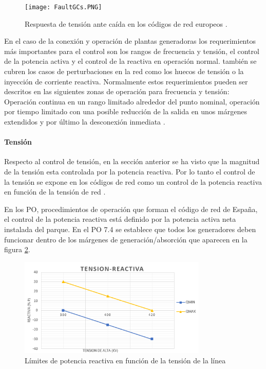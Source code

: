 \documentclass{book}
\begin{document}
\begin{figure}[h!]
\centering
\texttt{[image: FaultGCs.PNG]}
\caption{Respuesta de tensi\'on ante ca\'ida en los c\'odigos de red europeos \cite{FaultGC}.}
\label{FaultGCs}
\end{figure}

En el caso de la conexi\'on y operaci\'on de plantas generadoras los requerimientos m\'as importantes para el control son los rangos de frecuencia y tensi\'on, el control de la potencia activa y el control de la reactiva en operaci\'on normal. tambi\'en se cubren los casos de perturbaciones en la red como los huecos de tensi\'on o la inyecci\'on de corriente reactiva. Normalmente estos requerimientos pueden ser descritos en las siguientes zonas de operaci\'on para frecuencia y tensi\'on: Operaci\'on continua en un rango limitado alrededor del punto nominal, operaci\'on por tiempo limitado con una posible reducci\'on de la salida en unos m\'argenes extendidos y por \'ultimo la desconexi\'on inmediata \cite{GridCodeDeepAnalisys}.\par

		\paragraph{Tensi\'on}
Respecto al control de tensi\'on, en la secci\'on anterior se ha visto que la magnitud de la tensi\'on esta controlada por la potencia reactiva. Por lo tanto el control de la tensi\'on se expone en los c\'odigos de red como un control de la potencia reactiva en funci\'on de la tensi\'on de red \cite{WFgridcode}. \par

En los PO, procedimientos de operaci\'on que forman el c\'odigo de red de España, el control de la potencia reactiva est\'a definido por la potencia activa neta instalada del parque. En el PO 7.4 \cite{PO74}  se establece que todos los generadores deben funcionar dentro de los m\'argenes de generaci\'on/absorci\'on que aparecen en la figura \ref{VQgridcode}.   \par 

\begin{figure}[h!]
\centering
\includegraphics[width=0.8\textwidth]{VQgridcode.PNG}
\caption{L\'imites de potencia reactiva en funci\'on de la tensi\'on de la l\'inea}
\label{VQgridcode}
\end{figure}
\end{document}
